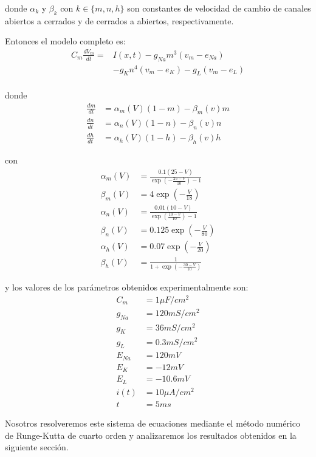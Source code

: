 \documentclass[aps,prl,reprint,groupedaddress]{revtex4-2}
\begin{document}
donde $\alpha_{k}$ y $\beta_{k}$ con $k \in \{m, n, h\}$ son constantes de velocidad 
de cambio de canales abiertos a cerrados y de cerrados a abiertos, respectivamente. 

Entonces el modelo completo es:
\begin{align*}
    C_{m} \frac{dV_{m}}{dt} = &I(x,t) - g_{Na}m^{3}(v_{m} - e_{Na})  \\
    &- g_{K}n^{4}(v_{m} - e_{K}) - g_{L}(v_{m} - e_{L}) \\
\end{align*}

donde 
\begin{align*}
    \frac{dm}{dt} &= \alpha_{m}(V)(1 - m) - \beta_{m}(v)m \\
    \frac{dn}{dt} &= \alpha_{n}(V)(1 - n) - \beta_{n}(v)n \\
    \frac{dh}{dt} &= \alpha_{h}(V)(1 - h) - \beta_{h}(v)h
\end{align*}

con 
\begin{align*}
    \alpha_{m}(V) &= \frac{0.1(25 - V)}{\exp\left(-\frac{25-V}{10}\right)-1} \\
    \beta_{m}(V) &= 4\exp\left(-\frac{V}{18}\right) \\
    \alpha_{n}(V) &= \frac{0.01(10 - V)}{\exp\left(\frac{10-V}{10}\right)-1} \\
    \beta_{n}(V) &= 0.125\exp\left(-\frac{V}{80}\right) \\
    \alpha_{h}(V) &= 0.07\exp\left(-\frac{V}{20}\right) \\
    \beta_{h}(V) &= \frac{1}{1 + \exp\left(-\frac{30-V}{10}\right)}
\end{align*}

y los valores de los parámetros obtenidos experimentalmente son:
\begin{align*}
    C_{m} &= 1 \mu F/cm^{2} \\
    g_{Na} &= 120 mS/cm^{2} \\
    g_{K} &= 36 mS/cm^{2} \\
    g_{L} &= 0.3 mS/cm^{2} \\
    E_{Na} &= 120 mV \\
    E_{K} &= -12 mV \\
    E_{L} &= -10.6 mV \\
    i(t) &= 10 \mu A/cm^{2}\\
    t &= 5 ms
\end{align*}

Nosotros resolveremos este sistema de ecuaciones mediante el método numérico de
Runge-Kutta de cuarto orden y analizaremos los resultados obtenidos en la
siguiente sección.
\end{document}
